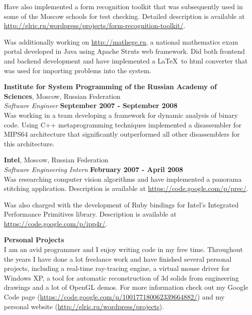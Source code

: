 \documentclass[margin,line]{CV}
\begin{document}
\begin{resume}
    Have also implemented a form recognition toolkit that was subsequently used in some of the Moscow schools for test checking. Detailed description is available at \url{http://elric.ru/wordpress/projects/form-recognition-toolkit/}. 

    Was additionally working on \url{http://mathege.ru}, a national mathematics exam portal developed in Java using Apache Struts web framework. Did both frontend and backend development and have implemented a \LaTeX~to html converter that was used for importing problems into the system.

    
    \pagebreak    

    
    \textbf{Institute for System Programming of the Russian Academy of Sciences}, Moscow, Russian Federation \vspace{2mm}\\\vspace{1mm}%
    \textsl{Software Engineer} \hfill \textbf{September 2007 - September 2008}\\
    Was working in a team developing a framework for dynamic analysis of binary code. Using C++ metaprogramming techniques implemented a disassembler for MIPS64 architecture that significantly outperformed all other disassemblers for this architecture.

   
    \textbf{Intel}, Moscow, Russian Federation \vspace{2mm}\\\vspace{1mm}%
    \textsl{Software Engineering Intern} \hfill \textbf{February 2007 - April 2008}\\
    Was researching computer vision algorithms and have implemented a panorama stitching application. Description is available at \url{https://code.google.com/p/prec/}.

    Was also charged with the development of Ruby bindings for Intel's Integrated Performance Primitives library. Description is available at \url{https://code.google.com/p/ipp4r/}.
    
    
    \textbf{Personal Projects} \vspace{2mm}\\\vspace{1mm}%
    I am an avid programmer and I enjoy writing code in my free time. Throughout the years I have done a lot freelance work and have finished several personal projects, including a real-time ray-tracing engine, a virtual mouse driver for Windows XP, a tool for automatic reconstruction of 3d solids from engineering drawings and a lot of OpenGL demos. For more information check out my Google Code page (\url{https://code.google.com/u/100177180062339664882/}) and my personal website (\url{http://elric.ru/wordpress/projects}).
   

\end{resume}
\end{document}
